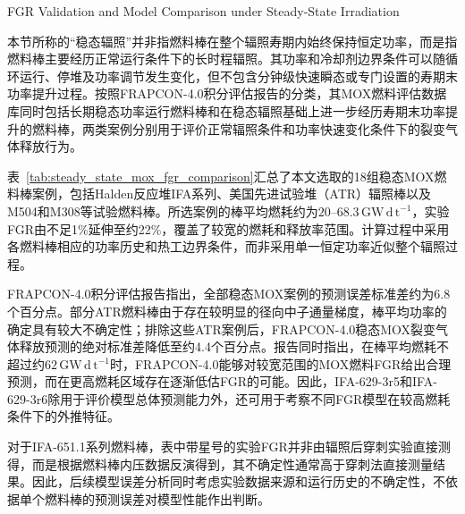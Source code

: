 {FGR Validation and Model Comparison under Steady-State Irradiation}

本节所称的“稳态辐照”并非指燃料棒在整个辐照寿期内始终保持恒定功率，而是指燃料棒主要经历正常运行条件下的长时程辐照。其功率和冷却剂边界条件可以随循环运行、停堆及功率调节发生变化，但不包含分钟级快速瞬态或专门设置的寿期末功率提升过程。按照FRAPCON-4.0积分评估报告的分类，其MOX燃料评估数据库同时包括长期稳态功率运行燃料棒和在稳态辐照基础上进一步经历寿期末功率提升的燃料棒，两类案例分别用于评价正常辐照条件和功率快速变化条件下的裂变气体释放行为。

表~\ref{tab:steady_state_mox_fgr_comparison}汇总了本文选取的18组稳态MOX燃料棒案例，包括Halden反应堆IFA系列、美国先进试验堆（ATR）辐照棒以及M504和M308等试验燃料棒。所选案例的棒平均燃耗约为$20$--$68.3\,\mathrm{GW\,d\,t^{-1}}$，实验FGR由不足1\%延伸至约22\%，覆盖了较宽的燃耗和释放率范围。计算过程中采用各燃料棒相应的功率历史和热工边界条件，而非采用单一恒定功率近似整个辐照过程。

FRAPCON-4.0积分评估报告指出，全部稳态MOX案例的预测误差标准差约为6.8个百分点。部分ATR燃料棒由于存在较明显的径向中子通量梯度，棒平均功率的确定具有较大不确定性；排除这些ATR案例后，FRAPCON-4.0稳态MOX裂变气体释放预测的绝对标准差降低至约4.4个百分点。报告同时指出，在棒平均燃耗不超过约$62\,\mathrm{GW\,d\,t^{-1}}$时，FRAPCON-4.0能够对较宽范围的MOX燃料FGR给出合理预测，而在更高燃耗区域存在逐渐低估FGR的可能。因此，IFA-629-3r5和IFA-629-3r6除用于评价模型总体预测能力外，还可用于考察不同FGR模型在较高燃耗条件下的外推特征。

对于IFA-651.1系列燃料棒，表中带星号的实验FGR并非由辐照后穿刺实验直接测得，而是根据燃料棒内压数据反演得到，其不确定性通常高于穿刺法直接测量结果。因此，后续模型误差分析同时考虑实验数据来源和运行历史的不确定性，不依据单个燃料棒的预测误差对模型性能作出判断。


